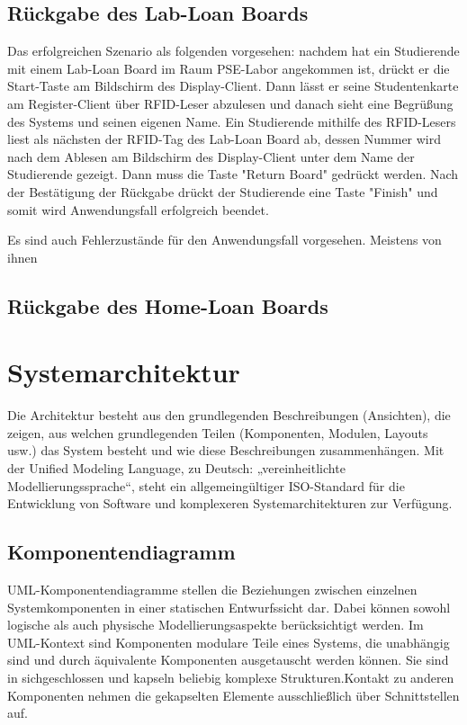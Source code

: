 \subsection{Rückgabe des Lab-Loan Boards}
\label{sec:design:use_cases:lab_return}
Das erfolgreichen Szenario als folgenden vorgesehen: nachdem hat ein Studierende mit einem Lab-Loan Board im Raum PSE-Labor angekommen ist, drückt er die Start-Taste am Bildschirm des Display-Client. Dann lässt er seine Studentenkarte am Register-Client über RFID-Leser abzulesen und danach sieht eine Begrüßung des Systems und seinen eigenen Name. Ein Studierende mithilfe des RFID-Lesers liest als nächsten der RFID-Tag des Lab-Loan Board ab, dessen Nummer wird nach dem Ablesen am Bildschirm des Display-Client unter dem Name der Studierende gezeigt. Dann muss die Taste "Return Board" gedrückt werden. Nach der Bestätigung der Rückgabe drückt der Studierende eine Taste "Finish" und somit wird Anwendungsfall erfolgreich beendet.

Es sind auch Fehlerzustände für den Anwendungsfall vorgesehen. Meistens von ihnen  

\subsection{Rückgabe des Home-Loan Boards}
\label{sec:design:use_cases:home_return}

\section{Systemarchitektur}
\label{sec:design:uml}
Die Architektur besteht aus den grundlegenden Beschreibungen (Ansichten),  die zeigen, aus welchen grundlegenden Teilen (Komponenten, Modulen, Layouts usw.) das System besteht und wie diese Beschreibungen zusammenhängen. Mit der Unified Modeling Language, zu Deutsch: „vereinheitlichte Modellierungssprache“, steht ein allgemeingültiger ISO-Standard für die Entwicklung von Software und komplexeren Systemarchitekturen zur Verfügung\cite{website:20}.

\subsection{Komponentendiagramm}
\label{sec:design:uml:uml_component}
UML-Komponentendiagramme stellen die Beziehungen zwischen einzelnen Systemkomponenten in einer statischen Entwurfssicht dar. Dabei können sowohl logische als auch physische Modellierungsaspekte berücksichtigt werden. Im UML-Kontext sind Komponenten modulare Teile eines Systems, die unabhängig sind und durch äquivalente Komponenten ausgetauscht werden können. Sie sind in sichgeschlossen und kapseln beliebig komplexe Strukturen.Kontakt zu anderen Komponenten nehmen die gekapselten Elemente ausschließlich über Schnittstellen auf\cite{website:20}.


